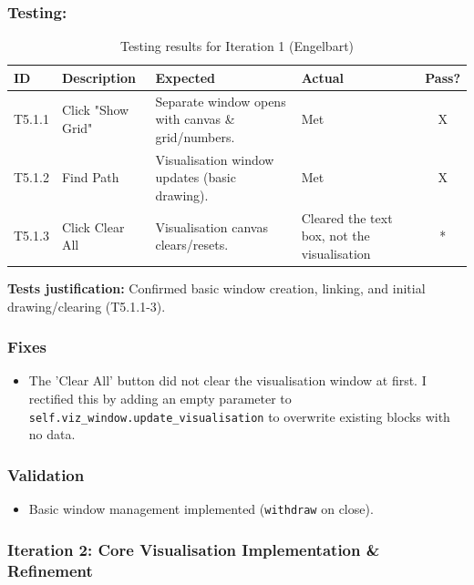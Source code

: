 \subsubsection{Testing:}
\begin{table}[htbp]
	\centering
	\begin{tabularx}{\textwidth}{|l|X|p{4.5cm}|p{4cm}|c|}
		\hline
		\textbf{ID} & \textbf{Description} & \textbf{Expected} & \textbf{Actual} & \textbf{Pass?} \\
		\hline
		T5.1.1 & Click "Show Grid" & Separate window opens with canvas \& grid/numbers. & Met & X \\
		\hline
		T5.1.2 & Find Path & Visualisation window updates (basic drawing). & Met & X \\
		\hline
		T5.1.3 & Click Clear All & Visualisation canvas clears/resets. & Cleared the text box, not the visualisation & * \\
		\hline
	\end{tabularx}
	\caption{Testing results for Iteration 1 (Engelbart)}
\end{table}
\textbf{Tests justification:} Confirmed basic window creation, linking, and initial drawing/clearing (T5.1.1-3).

\subsubsection{Fixes}
\begin{itemize}
	\item The 'Clear All' button did not clear the visualisation window at first. I rectified this by adding an empty parameter to \verb| self.viz_window.update_visualisation| to overwrite existing blocks with no data.
\end{itemize}

\subsubsection{Validation}
\begin{itemize}
	\item Basic window management implemented (\verb|withdraw| on close).
\end{itemize}


\subsubsection{Iteration 2: Core Visualisation Implementation \& Refinement}

